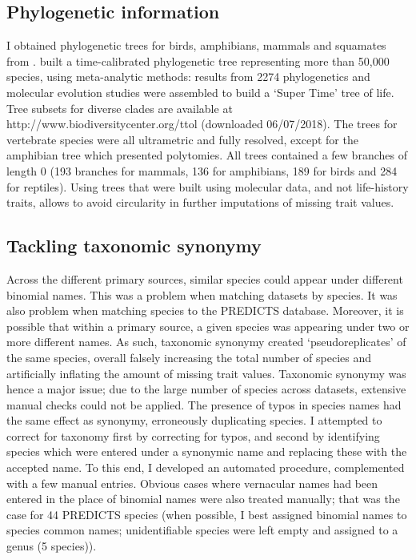 \subsection{Phylogenetic information}
I obtained phylogenetic trees for birds, amphibians, mammals and squamates from \citet{Hedges2015}. \citet{Hedges2015} built a time-calibrated phylogenetic tree representing more than 50,000 species, using meta-analytic methods: results from 2274 phylogenetics and molecular evolution studies were assembled to build a `Super Time' tree of life. Tree subsets for diverse clades are available at http://www.biodiversitycenter.org/ttol (downloaded 06/07/2018). The trees for vertebrate species were all ultrametric and fully resolved, except for the amphibian tree which presented polytomies. All trees contained a few branches of length 0 (193 branches for mammals, 136 for amphibians, 189 for birds and 284 for reptiles). Using trees that were built using molecular data, and not life-history traits, allows to avoid circularity in further imputations of missing trait values.


\subsection{Tackling taxonomic synonymy}
Across the different primary sources, similar species could appear under different binomial names. This was a problem when matching datasets by species. It was also problem when matching species to the PREDICTS database. Moreover, it is possible that within a primary source, a given species was appearing under two or more different names. As such, taxonomic synonymy created `pseudoreplicates' of the same species, overall falsely increasing the total number of species and artificially inflating the amount of missing trait values. Taxonomic synonymy was hence a major issue; due to the large number of species across datasets, extensive manual checks could not be applied. The presence of typos in species names had the same effect as synonymy, erroneously duplicating species. I attempted to correct for taxonomy first by correcting for typos, and second by identifying species which were entered under a synonymic name and replacing these with the accepted name. To this end, I developed an automated procedure, complemented with a few manual entries. Obvious cases where vernacular names had been entered in the place of binomial names were also treated manually; that was the case for 44 PREDICTS species (when possible, I best assigned binomial names to species common names; unidentifiable species were left empty and assigned to a genus (5 species)).

